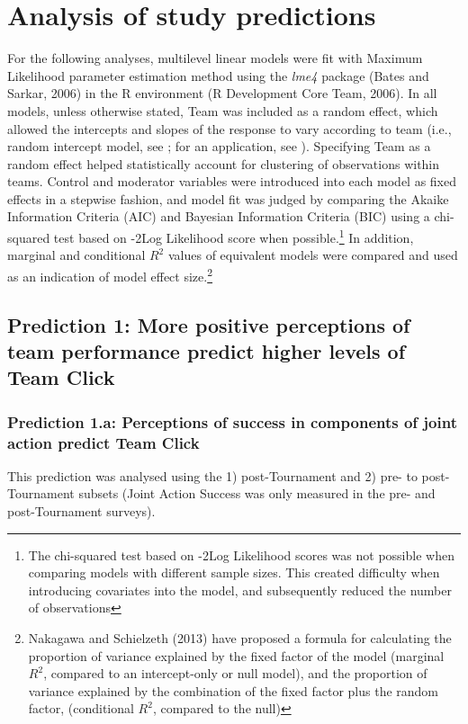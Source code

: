 \section{Analysis of study predictions}
For the following analyses, multilevel linear models were fit with Maximum Likelihood parameter estimation method using the \textit{lme4} package (Bates and Sarkar, 2006) in the R environment (R Development Core Team, 2006).   In all models, unless otherwise stated, Team was included as a random effect, which allowed the intercepts and slopes of the response to vary according to team (i.e., random intercept model, see \citep{Pinheiro2000}; for an application, see \citep{Oberauer2006}). Specifying Team as a random effect helped statistically account for clustering of observations within teams. Control and moderator variables were introduced into each model as fixed effects in a stepwise fashion, and model fit was judged by comparing the Akaike Information Criteria (AIC) and Bayesian Information Criteria (BIC) using a chi-squared test based on -2Log Likelihood score when possible.\footnote{The chi-squared test based on -2Log Likelihood scores was not possible when comparing models with different sample sizes.
This created difficulty when introducing covariates into the model, and subsequently reduced the number of observations} In addition, marginal and conditional $R^2$ values of equivalent models were compared and used as an indication of model effect size.\footnote{Nakagawa and Schielzeth (2013) have proposed a formula for calculating the proportion of variance explained by the fixed factor of the model (marginal $R^2$, compared to an intercept-only or null model), and the proportion of variance explained by the combination of the fixed factor plus the random factor, (conditional $R^2$, compared to the null)}

\subsection{Prediction 1: More positive perceptions of team performance predict higher levels of Team Click}

\subsubsection{Prediction 1.a: Perceptions of success in components of joint action predict Team Click}

This prediction was analysed using the 1) post-Tournament and 2) pre- to post-Tournament subsets (Joint Action Success was only measured in the pre- and post-Tournament surveys).

